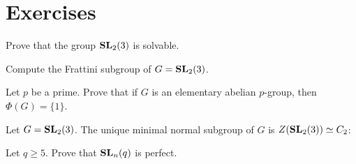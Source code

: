 



\section{Exercises}
\begin{prob}
	Prove that the group $\mathbf{SL}_2(3)$ is solvable. 
\end{prob}

\begin{prob}
	Compute the Frattini subgroup of $G=\mathbf{SL}_2(3)$.  
\end{prob}

\begin{prob}
	Let $p$ be a prime.  Prove that if $G$ is an elementary abelian $p$-group, then 
	$\Phi(G)=\{1\}$.
\end{prob}

\begin{prob}
	Let $G=\mathbf{SL}_2(3)$. The unique minimal normal subgroup of $G$ is
	$Z(\mathbf{SL}_2(3))\simeq C_2$:
\end{prob}



\begin{prob}
Let $q\geq5$. 
Prove that $\mathbf{SL}_n(q)$ is perfect.  	
\end{prob}


